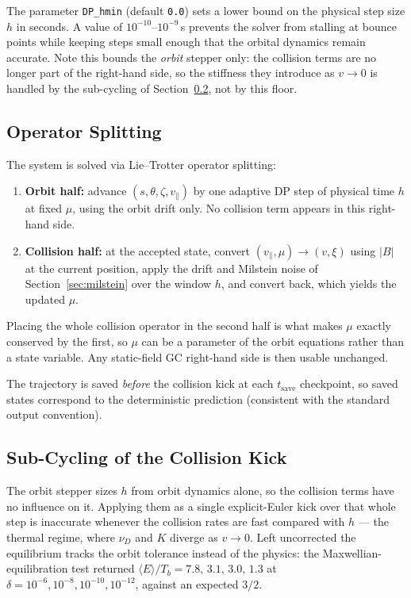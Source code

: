 \documentclass[11pt]{article}
\newcommand{\vpar}{v_{\!\parallel}}
\begin{document}
The parameter \texttt{DP\_hmin} (default \texttt{0.0}) sets a lower bound on the
physical step size $h$ in seconds.  A value of $10^{-10}$--$10^{-9}$\,s prevents the
solver from stalling at bounce points while keeping steps small enough that the orbital
dynamics remain accurate.  Note this bounds the \emph{orbit} stepper only: the
collision terms are no longer part of the right-hand side, so the stiffness they
introduce as $v\to0$ is handled by the sub-cycling of Section~\ref{sec:subcycling},
not by this floor.

\subsection{Operator Splitting}
\label{sec:splitting}

The system is solved via Lie--Trotter operator splitting:
\begin{enumerate}
  \item \textbf{Orbit half:} advance $(s,\theta,\zeta,\vpar)$ by one adaptive DP
        step of physical time $h$ at fixed $\mu$, using the orbit drift only.
        No collision term appears in this right-hand side.
  \item \textbf{Collision half:} at the accepted state, convert
        $(\vpar,\mu)\to(v,\xi)$ using $|B|$ at the current position, apply the
        drift and Milstein noise of Section~\ref{sec:milstein} over the window
        $h$, and convert back, which yields the updated $\mu$.
\end{enumerate}
Placing the whole collision operator in the second half is what makes $\mu$
exactly conserved by the first, so $\mu$ can be a parameter of the orbit
equations rather than a state variable.  Any static-field GC right-hand side is
then usable unchanged.

The trajectory is saved \emph{before} the collision kick at each
$t_{\mathrm{save}}$ checkpoint, so saved states correspond to the deterministic
prediction (consistent with the standard output convention).

\subsection{Sub-Cycling of the Collision Kick}
\label{sec:subcycling}

The orbit stepper sizes $h$ from orbit dynamics alone, so the collision terms
have no influence on it.  Applying them as a single explicit-Euler kick over
that whole step is inaccurate whenever the collision rates are fast compared
with $h$ --- the thermal regime, where $\nu_D$ and $K$ diverge as $v\to0$.
Left uncorrected the equilibrium tracks the orbit tolerance instead of the
physics: the Maxwellian-equilibration test returned
$\langle E\rangle/T_b = 7.8,\,3.1,\,3.0,\,1.3$ at
$\delta = 10^{-6},10^{-8},10^{-10},10^{-12}$, against an expected $3/2$.
\end{document}
